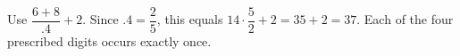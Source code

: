 Use $\boxed{\dfrac{6+8}{.4}+2}$. Since $.4=\dfrac{2}{5}$, this equals $14\cdot\dfrac{5}{2}+2=35+2=37$. Each of the four prescribed digits occurs exactly once.
